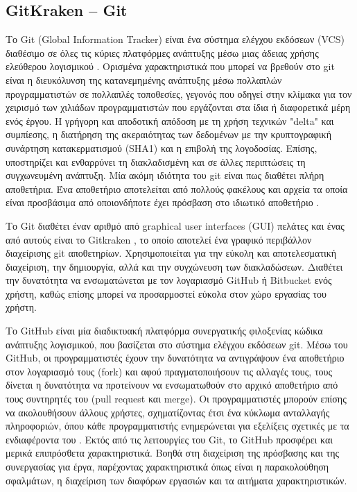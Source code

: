 \subsection{GitKraken – Git}
Το Git (Global Information Tracker) είναι ένα σύστημα ελέγχου εκδόσεων (VCS) διαθέσιμο σε όλες τις κύριες πλατφόρμες ανάπτυξης μέσω μιας άδειας χρήσης ελεύθερου λογισμικού \cite{spinellis2012git}. Ορισμένα χαρακτηριστικά που μπορεί να βρεθούν στο git είναι η διευκόλυνση της κατανεμημένης ανάπτυξης μέσω πολλαπλών προγραμματιστών σε πολλαπλές τοποθεσίες, γεγονός που οδηγεί στην κλίμακα για τον χειρισμό των χιλιάδων προγραμματιστών που εργάζονται στα ίδια ή διαφορετικά μέρη ενός έργου. Η γρήγορη και αποδοτική απόδοση με τη χρήση τεχνικών "delta" και συμπίεσης, η διατήρηση της ακεραιότητας των δεδομένων με την κρυπτογραφική συνάρτηση κατακερματισμού (SHA1) και η επιβολή της λογοδοσίας. Επίσης, υποστηρίζει και ενθαρρύνει τη διακλαδισμένη και σε άλλες περιπτώσεις τη συγχωνευμένη ανάπτυξη. Μία ακόμη ιδιότητα του git είναι πως διαθέτει πλήρη αποθετήρια. Ένα αποθετήριο αποτελείται από πολλούς φακέλους και αρχεία τα οποία είναι προσβάσιμα από οποιονδήποτε έχει πρόσβαση στο ιδιωτικό αποθετήριο \cite{loeliger2012version}. 

Το Git διαθέτει έναν αριθμό από graphical user interfaces (GUI) πελάτες και ένας από αυτούς είναι το Gitkraken \cite{gitkrakenwhatisit}, το οποίο αποτελεί ένα γραφικό περιβάλλον διαχείρισης git αποθετηρίων. Χρησιμοποιείται για την εύκολη και αποτελεσματική διαχείριση, την δημιουργία, αλλά και την συγχώνευση των διακλαδώσεων. Διαθέτει την δυνατότητα να ενσωματώνεται με τον λογαριασμό GitHub ή Bitbucket ενός χρήστη, καθώς επίσης μπορεί να προσαρμοστεί εύκολα στον χώρο εργασίας του χρήστη.

Το GitHub είναι μία διαδικτυακή πλατφόρμα συνεργατικής φιλοξενίας κώδικα ανάπτυξης λογισμικού, που βασίζεται στο σύστημα ελέγχου εκδόσεων git. Μέσω του GitHub, οι προγραμματιστές έχουν την δυνατότητα να αντιγράψουν ένα αποθετήριο στον λογαριασμό τους (fork) και αφού πραγματοποιήσουν τις αλλαγές τους, τους δίνεται η δυνατότητα να προτείνουν  να ενσωματωθούν στο αρχικό αποθετήριο από τους συντηρητές του (pull request και merge). Οι προγραμματιστές μπορούν επίσης να ακολουθήσουν άλλους χρήστες, σχηματίζοντας έτσι ένα κύκλωμα ανταλλαγής πληροφοριών, όπου κάθε προγραμματιστής ενημερώνεται για εξελίξεις σχετικές με τα ενδιαφέροντα του \cite{kalliamvakou2014promises}. Εκτός από τις λειτουργίες του Git, το GitHub προσφέρει και μερικά επιπρόσθετα χαρακτηριστικά. Βοηθά στη διαχείριση της πρόσβασης και της συνεργασίας για έργα, παρέχοντας χαρακτηριστικά όπως είναι η παρακολούθηση σφαλμάτων, η διαχείριση των διαφόρων εργασιών και τα αιτήματα χαρακτηριστικών.

